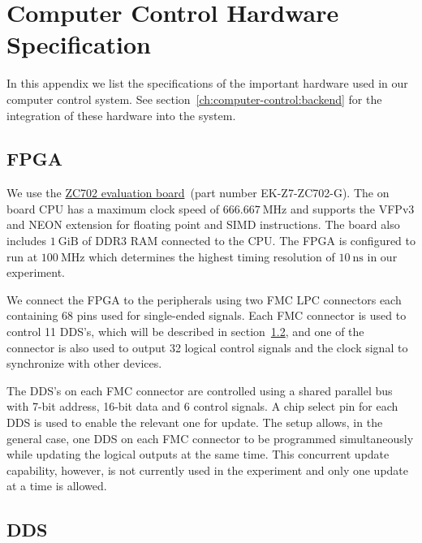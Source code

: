 
\chapter{Computer Control Hardware Specification}
\label{appendex:computer-control}

In this appendix we list the specifications of the important hardware
used in our computer control system.
See section~\ref{ch:computer-control:backend} for the integration
of these hardware into the system.

\section{FPGA}
\label{appendex:computer-control:fpga}

We use the \href{https://www.xilinx.com/products/boards-and-kits/ek-z7-zc702-g.html}{ZC702 evaluation board}~(part number EK-Z7-ZC702-G).
The on board CPU has a maximum clock speed of $666.667~\mathrm{MHz}$
and supports the VFPv3 and NEON extension for floating point and SIMD instructions.
The board also includes $1~\mathrm{GiB}$ of DDR3 RAM connected to the CPU.
The FPGA is configured to run at $100~\mathrm{MHz}$ which determines
the highest timing resolution of $10~\mathrm{ns}$ in our experiment.

We connect the FPGA to the peripherals using two FMC LPC connectors
each containing 68 pins used for single-ended signals.
Each FMC connector is used to control 11 DDS's,
which will be described in section~\ref{appendex:computer-control:dds},
and one of the connector is also used to output 32 logical control signals
and the clock signal to synchronize with other devices.

The DDS's on each FMC connector are controlled using a shared parallel bus
with 7-bit address, 16-bit data and 6 control signals.
A chip select pin for each DDS is used to enable the relevant one for update.
The setup allows, in the general case, one DDS on each FMC connector to be programmed
simultaneously while updating the logical outputs at the same time.
This concurrent update capability, however, is not currently used in the experiment
and only one update at a time is allowed.

\section{DDS}
\label{appendex:computer-control:dds}

